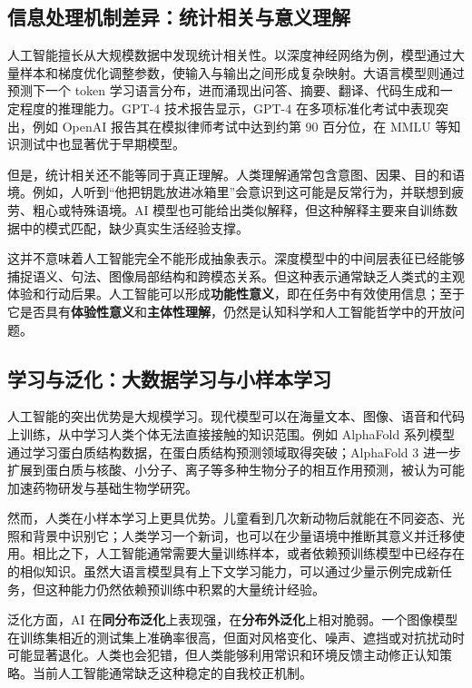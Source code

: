 \documentclass[UTF8,zihao=5,a4paper]{ctexart}
\begin{document}
\subsection{信息处理机制差异：统计相关与意义理解}

人工智能擅长从大规模数据中发现统计相关性。以深度神经网络为例，模型通过大量样本和梯度优化调整参数，使输入与输出之间形成复杂映射。大语言模型则通过预测下一个 token 学习语言分布，进而涌现出问答、摘要、翻译、代码生成和一定程度的推理能力。GPT-4 技术报告显示，GPT-4 在多项标准化考试中表现突出，例如 OpenAI 报告其在模拟律师考试中达到约第 90 百分位，在 MMLU 等知识测试中也显著优于早期模型\cite{openai2023gpt4}。

但是，统计相关还不能等同于真正理解。人类理解通常包含意图、因果、目的和语境。例如，人听到“他把钥匙放进冰箱里”会意识到这可能是反常行为，并联想到疲劳、粗心或特殊语境。AI 模型也可能给出类似解释，但这种解释主要来自训练数据中的模式匹配，缺少真实生活经验支撑。

这并不意味着人工智能完全不能形成抽象表示。深度模型中的中间层表征已经能够捕捉语义、句法、图像局部结构和跨模态关系。但这种表示通常缺乏人类式的主观体验和行动后果。人工智能可以形成\textbf{功能性意义}，即在任务中有效使用信息；至于它是否具有\textbf{体验性意义}和\textbf{主体性理解}，仍然是认知科学和人工智能哲学中的开放问题。

\subsection{学习与泛化：大数据学习与小样本学习}

人工智能的突出优势是大规模学习。现代模型可以在海量文本、图像、语音和代码上训练，从中学习人类个体无法直接接触的知识范围。例如 AlphaFold 系列模型通过学习蛋白质结构数据，在蛋白质结构预测领域取得突破；AlphaFold 3 进一步扩展到蛋白质与核酸、小分子、离子等多种生物分子的相互作用预测，被认为可能加速药物研发与基础生物学研究\cite{alphafold2024nature}。

然而，人类在小样本学习上更具优势。儿童看到几次新动物后就能在不同姿态、光照和背景中识别它；人类学习一个新词，也可以在少量语境中推断其意义并迁移使用。相比之下，人工智能通常需要大量训练样本，或者依赖预训练模型中已经存在的相似知识。虽然大语言模型具有上下文学习能力，可以通过少量示例完成新任务，但这种能力仍然依赖预训练中积累的大量统计经验。

泛化方面，AI 在\textbf{同分布泛化}上表现强，在\textbf{分布外泛化}上相对脆弱。一个图像模型在训练集相近的测试集上准确率很高，但面对风格变化、噪声、遮挡或对抗扰动时可能显著退化。人类也会犯错，但人类能够利用常识和环境反馈主动修正认知策略。当前人工智能通常缺乏这种稳定的自我校正机制。
\end{document}
